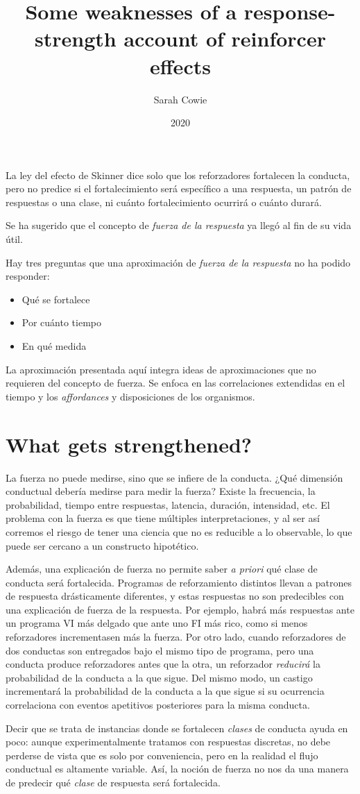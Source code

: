 \documentclass[a4paper,12pt]{article}
\title{Some weaknesses of a response-strength account of reinforcer effects}
\author{Sarah Cowie}
\date{2020}
\begin{document}
{\scshape\bfseries \maketitle}

La ley del efecto de Skinner dice solo que los reforzadores fortalecen la conducta, pero no predice si el fortalecimiento será específico a una respuesta, un patrón de respuestas o una clase, ni cuánto fortalecimiento ocurrirá o cuánto durará.

Se ha sugerido que el concepto de {\itshape fuerza de la respuesta} ya llegó al fin de su vida útil.

Hay tres preguntas que una aproximación de {\itshape fuerza de la respuesta} no ha podido responder:
\begin{itemize}
    \item Qué se fortalece
    \item Por cuánto tiempo
    \item En qué medida
\end{itemize}

La aproximación presentada aquí integra ideas de aproximaciones que no requieren del concepto de fuerza. Se enfoca en las correlaciones extendidas en el tiempo y los {\itshape affordances} y disposiciones de los organismos.

\section{What gets strengthened?}

La fuerza no puede medirse, sino que se infiere de la conducta. ¿Qué dimensión conductual debería medirse para medir la fuerza? Existe la frecuencia, la probabilidad, tiempo entre respuestas, latencia, duración, intensidad, etc.
El problema con la fuerza es que tiene múltiples interpretaciones, y al ser así corremos el riesgo de tener una ciencia que no es reducible a lo observable, lo que puede ser cercano a un constructo hipotético.

Además, una explicación de fuerza no permite saber {\itshape a priori} qué clase de conducta será fortalecida. Programas de reforzamiento distintos llevan a patrones de respuesta drásticamente diferentes, y estas respuestas no son predecibles con una explicación de fuerza de la respuesta.
Por ejemplo, habrá más respuestas ante un programa VI más delgado que ante uno FI más rico, como si menos reforzadores incrementasen más la fuerza. Por otro lado, cuando reforzadores de dos conductas son entregados bajo el mismo tipo de programa, pero una conducta produce reforzadores antes que la otra, un reforzador {\itshape reducirá} la probabilidad de la conducta a la que sigue.
Del mismo modo, un castigo incrementará la probabilidad de la conducta a la que sigue si su ocurrencia correlaciona con eventos apetitivos posteriores para la misma conducta.

Decir que se trata de instancias donde se fortalecen {\itshape clases} de conducta ayuda en poco: aunque experimentalmente tratamos con respuestas discretas, no debe perderse de vista que es solo por conveniencia, pero en la realidad el flujo conductual es altamente variable. Así, la noción de fuerza no nos da una manera de predecir qué {\itshape clase} de respuesta será fortalecida.
\end{document}
